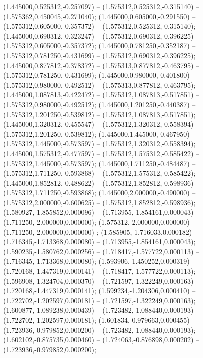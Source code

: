  (1.445000,0.525312,-0.257097) -- (1.575312,0.525312,-0.315140) -- (1.575362,0.450045,-0.271040);
 (1.445000,0.605000,-0.291550) -- (1.575312,0.605000,-0.357372) -- (1.575312,0.525312,-0.315140);
 (1.445000,0.690312,-0.323247) -- (1.575312,0.690312,-0.396225) -- (1.575312,0.605000,-0.357372);
 (1.445000,0.781250,-0.352187) -- (1.575312,0.781250,-0.431699) -- (1.575312,0.690312,-0.396225);
 (1.445000,0.877812,-0.378372) -- (1.575313,0.877812,-0.463795) -- (1.575312,0.781250,-0.431699);
 (1.445000,0.980000,-0.401800) -- (1.575312,0.980000,-0.492512) -- (1.575313,0.877812,-0.463795);
 (1.445000,1.087813,-0.422472) -- (1.575312,1.087813,-0.517851) -- (1.575312,0.980000,-0.492512);
 (1.445000,1.201250,-0.440387) -- (1.575312,1.201250,-0.539812) -- (1.575312,1.087813,-0.517851);
 (1.445000,1.320312,-0.455547) -- (1.575312,1.320312,-0.558394) -- (1.575312,1.201250,-0.539812);
 (1.445000,1.445000,-0.467950) -- (1.575312,1.445000,-0.573597) -- (1.575312,1.320312,-0.558394);
 (1.445000,1.575312,-0.477597) -- (1.575312,1.575312,-0.585422) -- (1.575312,1.445000,-0.573597);
 (1.445000,1.711250,-0.484487) -- (1.575312,1.711250,-0.593868) -- (1.575312,1.575312,-0.585422);
 (1.445000,1.852812,-0.488622) -- (1.575312,1.852812,-0.598936) -- (1.575312,1.711250,-0.593868);
 (1.445000,2.000000,-0.490000) -- (1.575312,2.000000,-0.600625) -- (1.575312,1.852812,-0.598936);
 (1.580927,-1.855852,0.000096) -- (1.713955,-1.854161,0.000043) -- (1.711250,-2.000000,0.000000);
 (1.575312,-2.000000,0.000000) -- (1.711250,-2.000000,0.000000) ;
 (1.585905,-1.716033,0.000182) -- (1.716345,-1.713368,0.000080) -- (1.713955,-1.854161,0.000043);
 (1.590235,-1.580762,0.000256) -- (1.718417,-1.577722,0.000113) -- (1.716345,-1.713368,0.000080);
 (1.593906,-1.450252,0.000319) -- (1.720168,-1.447319,0.000141) -- (1.718417,-1.577722,0.000113);
 (1.596908,-1.324704,0.000370) -- (1.721597,-1.322249,0.000163) -- (1.720168,-1.447319,0.000141);
 (1.599234,-1.204306,0.000410) -- (1.722702,-1.202597,0.000181) -- (1.721597,-1.322249,0.000163);
 (1.600877,-1.089238,0.000439) -- (1.723482,-1.088440,0.000193) -- (1.722702,-1.202597,0.000181);
 (1.601834,-0.979663,0.000455) -- (1.723936,-0.979852,0.000200) -- (1.723482,-1.088440,0.000193);
 (1.602102,-0.875735,0.000460) -- (1.724063,-0.876898,0.000202) -- (1.723936,-0.979852,0.000200);

